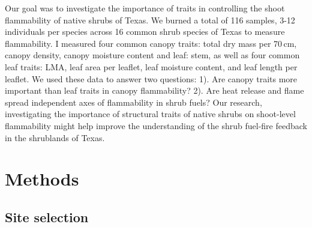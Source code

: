 \documentclass{ttuthes2007}
\begin{document}
\noindent Our goal was to investigate the importance of traits in controlling the shoot flammability of native shrubs of Texas. %
We burned a total of 116 samples, 3-12 individuals per species across 16 common shrub species of Texas to measure flammability. I measured four common canopy traits: total dry mass per 70\,cm, canopy density, canopy moisture content and leaf: stem, as well as four common leaf traits: LMA, leaf area per leaflet, leaf moisture content, and leaf length per leaflet. We used these data to answer two questions: 1). Are canopy traits more important than leaf traits in canopy flammability? 2). Are heat release and flame spread independent axes of flammability in shrub fuels? Our research, investigating the importance of structural traits of native shrubs on shoot-level flammability might help improve the understanding of the shrub fuel-fire feedback in the shrublands of Texas.


\section*{\textbf{Methods}}
\subsection*{\textbf{Site selection}}
\end{document}
